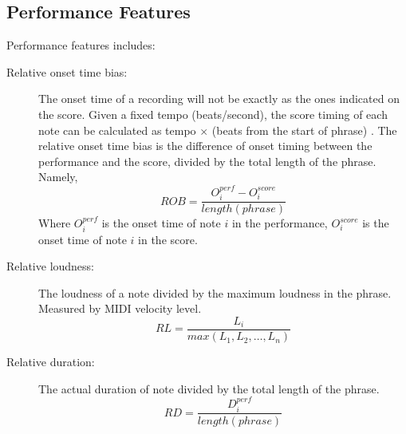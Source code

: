       \subsection{Performance Features}
      Performance features includes:
      \begin{description}
         \item [Relative onset time bias:] 
            The onset time of a recording will not be exactly as the ones indicated on the score. Given a fixed tempo (beats/second), the score timing of each note can be calculated as tempo $\times$ (beats from the start of phrase)  . The relative onset time bias is the difference of onset timing between the performance and the score, divided by the total length of the phrase. Namely,
            $$ ROB = \frac{O_i^{perf} - O_i^{score}  }{length(phrase)}$$ Where $O_i^{perf}$ is the onset time of note $i$ in the performance, $O_i^{score}$ is the onset time of note $i$ in the score. 
         \item [Relative loudness:] The loudness of a note divided by the maximum loudness in the phrase. Measured by MIDI velocity level.
            $$ RL = \frac{L_i}{max(L_1, L_2, \dots, L_n)}$$

         \item [Relative duration:]
            The actual duration of note divided by the total length of the phrase.
            $$ RD = \frac{ D_i^{perf}}{length(phrase)}$$
      \end{description}

